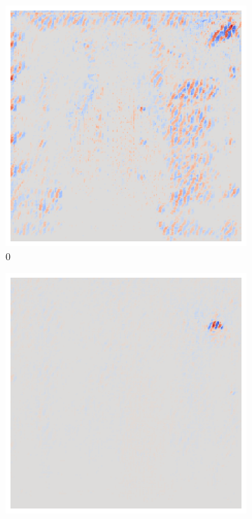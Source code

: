 \begin{figure}[ht!]
    \centering
    \begin{subfigure}{0.095\linewidth}
        \centering
        \includegraphics[height=1\linewidth]{01-images/05-resultate/uap_resnet/uap0-resnet18-covid-n200-robustificationslevel0.png}
        \caption{0}
    \end{subfigure}\hfill%
    \begin{subfigure}{0.095\linewidth}
        \centering
        \includegraphics[height=1\linewidth]{01-images/05-resultate/uap_resnet/uap0-resnet18-covid-n200-robustificationslevel1.png}

\end{subfigure}
\end{figure}

